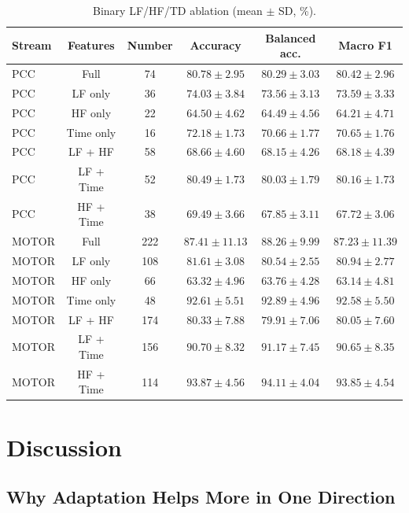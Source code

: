 \documentclass[letterpaper,journal]{IEEEtran}
\begin{document}
\begin{table}[t]
\centering
\footnotesize
\caption{Binary LF/HF/TD ablation (mean $\pm$ SD, \%).}
\label{tab:lfhf_ablation_anomaly2}
\renewcommand{\arraystretch}{1.12}
\setlength{\tabcolsep}{3pt}
\begin{tabular}{lccccc}
\hline
Stream & Features & Number & Accuracy & Balanced acc. & Macro F1 \\
\hline
PCC & Full & 74 & $80.78\pm2.95$ & $80.29\pm3.03$ & $80.42\pm2.96$ \\
PCC & LF only & 36 & $74.03\pm3.84$ & $73.56\pm3.13$ & $73.59\pm3.33$ \\
PCC & HF only & 22 & $64.50\pm4.62$ & $64.49\pm4.56$ & $64.21\pm4.71$ \\
PCC & Time only & 16 & $72.18\pm1.73$ & $70.66\pm1.77$ & $70.65\pm1.76$ \\
PCC & LF + HF & 58 & $68.66\pm4.60$ & $68.15\pm4.26$ & $68.18\pm4.39$ \\
PCC & LF + Time & 52 & $80.49\pm1.73$ & $80.03\pm1.79$ & $80.16\pm1.73$ \\
PCC & HF + Time & 38 & $69.49\pm3.66$ & $67.85\pm3.11$ & $67.72\pm3.06$ \\
MOTOR & Full & 222 & $87.41\pm11.13$ & $88.26\pm9.99$ & $87.23\pm11.39$ \\
MOTOR & LF only & 108 & $81.61\pm3.08$ & $80.54\pm2.55$ & $80.94\pm2.77$ \\
MOTOR & HF only & 66 & $63.32\pm4.96$ & $63.76\pm4.28$ & $63.14\pm4.81$ \\
MOTOR & Time only & 48 & $92.61\pm5.51$ & $92.89\pm4.96$ & $92.58\pm5.50$ \\
MOTOR & LF + HF & 174 & $80.33\pm7.88$ & $79.91\pm7.06$ & $80.05\pm7.60$ \\
MOTOR & LF + Time & 156 & $90.70\pm8.32$ & $91.17\pm7.45$ & $90.65\pm8.35$ \\
MOTOR & HF + Time & 114 & $93.87\pm4.56$ & $94.11\pm4.04$ & $93.85\pm4.54$ \\
\hline
\end{tabular}

\end{table}

\section{Discussion}
\label{sec:discussion}
\subsection{Why Adaptation Helps More in One Direction}
\label{sec:adaptation_asymmetry}
\end{document}
